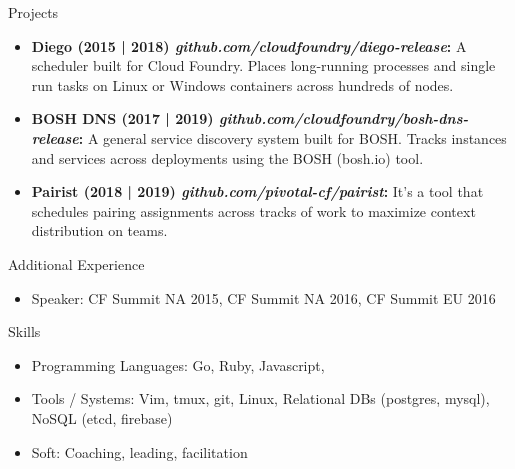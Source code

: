 \documentclass[]{mcdowellcv}
\begin{document}
\begin{cvsection}{Projects}
    \begin{cvsubsection}{}{}{}
	\begin{itemize}
	    \item \textbf{Diego (2015 | 2018) \emph{github.com/cloudfoundry/diego-release}:} A scheduler built for Cloud Foundry. Places long-running processes and single run tasks on Linux or Windows containers across hundreds of nodes.
	    \item \textbf{BOSH DNS (2017 | 2019) \emph{github.com/cloudfoundry/bosh-dns-release}:} A general service discovery system built for BOSH\@. Tracks instances and services across deployments using the BOSH (bosh.io) tool.
	    \item \textbf{Pairist (2018 | 2019) \emph{github.com/pivotal-cf/pairist}:} It's a tool that schedules pairing assignments across tracks of work to maximize context distribution on teams.
	\end{itemize}
    \end{cvsubsection}
\end{cvsection}

\begin{cvsection}{Additional Experience}
    \begin{cvsubsection}{}{}{}
	\begin{itemize}
	    \item Speaker: CF Summit NA 2015, CF Summit NA 2016, CF Summit EU 2016
	\end{itemize}
    \end{cvsubsection}
\end{cvsection}

\begin{cvsection}{Skills}
    \begin{cvsubsection}{}{}{}
	\begin{itemize}
	    \item Programming Languages:  Go, Ruby, Javascript,
	    \item Tools / Systems:  Vim, tmux, git, Linux, Relational DBs (postgres, mysql), NoSQL (etcd, firebase)
	    \item Soft:  Coaching, leading, facilitation
	\end{itemize}
    \end{cvsubsection}
\end{cvsection}
\end{document}
